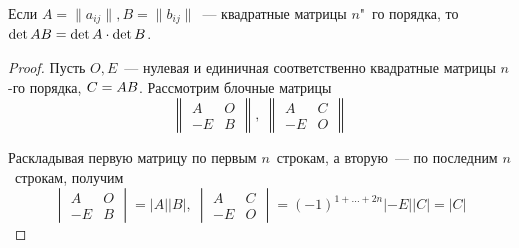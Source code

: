 \begin{theorem}
Если $A = \|a_{ij}\|, B = \|b_{ij}\|$~--- квадратные матрицы $n$"~го порядка, то $\det AB \opbr= \det A \cdot \det B$.
\end{theorem}
\begin{proof}
Пусть $O, E$~--- нулевая и единичная соответственно квадратные матрицы $n$-го порядка, $C \opbr= AB$.
Рассмотрим блочные матрицы
\begin{equation*}
\begin{Vmatrix}
A & O \\
-E & B
\end{Vmatrix}, \
\begin{Vmatrix}
A & C \\
-E & O
\end{Vmatrix}
\end{equation*}

Раскладывая первую матрицу по первым $n$~строкам, а вторую~--- по последним $n$~строкам, получим
\begin{equation*}
\begin{vmatrix}
A & O \\
-E & B
\end{vmatrix} =
|A| |B|, \
\begin{vmatrix}
A & C \\
-E & O
\end{vmatrix} =
(-1)^{1 + \ldots + 2n}|-E| |C| =
|C|
\end{equation*}


\end{proof}
